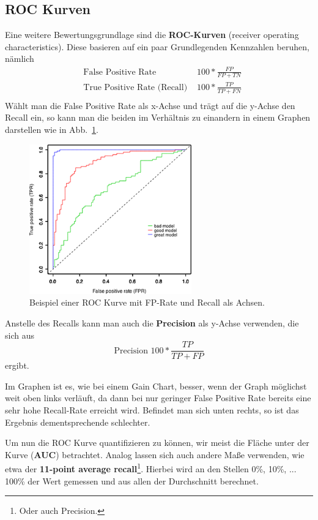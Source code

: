 \subsection{ROC Kurven}
Eine weitere Bewertungsgrundlage sind die \textbf{ROC-Kurven} (receiver operating
characteristics). Diese basieren auf ein paar Grundlegenden Kennzahlen beruhen,
nämlich
\begin{align*}
	&\text{False Positive Rate } &100 * \frac{FP}{FP+TN}\\
	&\text{True Positive Rate (Recall) } &100 * \frac{TP}{TP+FN}\\
\end{align*}
Wählt man die False Positive Rate als x-Achse und trägt auf die y-Achse den Recall
ein, so kann man die beiden im Verhältnis zu einandern in einem Graphen darstellen
wie in Abb.~\ref{fig:roc}.

\begin{figure}[ht]
	\centering
	\includegraphics[width=0.625\textwidth]{Figures/roc_curve}
	\caption[ROC Curve]{Beispiel einer ROC Kurve mit FP-Rate und Recall als Achsen.\footnotemark}
	\label{fig:roc}
\end{figure}

Anstelle des Recalls kann man auch die \textbf{Precision} als y-Achse verwenden,
die sich aus 
\[
	\text{Precision } 100 * \frac{TP}{TP+FP}
\]
ergibt.

Im Graphen ist es, wie bei einem Gain Chart, besser, wenn der Graph möglichst weit
oben links verläuft, da dann bei nur geringer False Positive Rate bereits eine
sehr hohe Recall-Rate erreicht wird. Befindet man sich unten rechts, so ist das
Ergebnis dementsprechende schlechter.

Um nun die ROC Kurve quantifizieren zu können, wir meist die Fläche unter der
Kurve (\textbf{AUC}) betrachtet. Analog lassen sich auch andere Maße verwenden,
wie etwa der \textbf{11-point average recall}\footnote{Oder auch Precision.}.
Hierbei wird an den Stellen 0\%, 10\%, ... 100\% der Wert gemessen und aus allen
der Durchschnitt berechnet.

